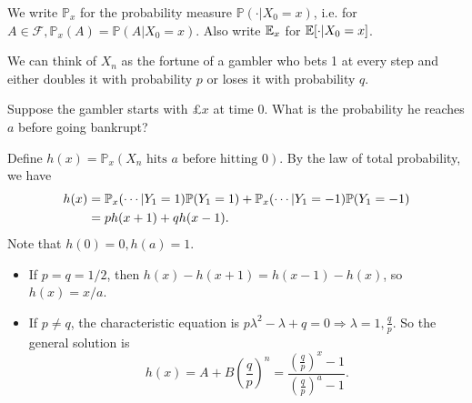\begin{notation}
    We write $ \mathbb{P}_x $ for the probability measure $ \mathbb{P}(\cdot | X_0=x) $, i.e. for $ A\in \mathscr{F}, \mathbb{P}_x(A) = \mathbb{P}(A|X_0=x) $. Also write $ {\mathbb{E}}_x $ for $ {\mathbb{E}}[\cdot|X_0=x] $.
\end{notation}

We can think of $X_n$ as the fortune of a gambler who bets 1 at every step and either doubles it with probability $p$ or loses it with probability $q$.
\begin{example}
    Suppose the gambler starts with \pounds$ x $ at time 0. What is the probability he reaches $a$ before going bankrupt?

    Define $ h(x) = \mathbb{P}_x(X_n \text{ hits }a \text{ before hitting }0) $. By the law of total probability, we have
    \begin{align*}
        h(x)&={\mathbb{P}}_x(\cdots|Y_1=1)\mathbb{P}(Y_1=1)+\mathbb{P}_x(\cdots|Y_1=-1)\mathbb{P}(Y_1=-1)\\ 
       &= p h(x+1)+q h(x-1).
    \end{align*}
    Note that $ h(0)=0,h(a)=1$.
    \begin{itemize}
        \item If $ p=q=1/2 $, then $ h(x)-h(x+1)=h(x-1)-h(x) $, so $ h(x) = x/a $.
        \item If $ p\neq q $, the characteristic equation is $ p\lambda^2-\lambda+q=0 \Rightarrow \lambda=1,\frac{q}{p} $. So the general solution is 
        \[
            h(x) = A+B\left( \frac{q}{p} \right)^n = \frac{\left( \frac{q}{p} \right)^x-1}{\left( \frac{q}{p} \right)^a-1}.
        \]
    \end{itemize}
\end{example}
